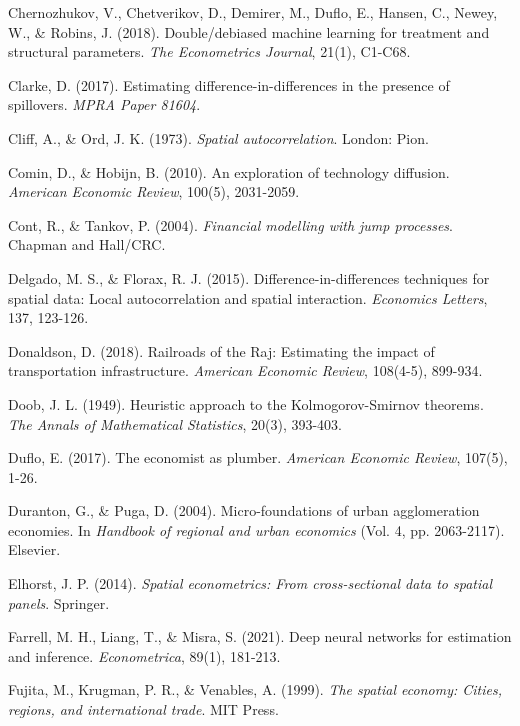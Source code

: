 \begin{thebibliography}{99}
Chernozhukov, V., Chetverikov, D., Demirer, M., Duflo, E., Hansen, C., Newey, W., \& Robins, J. (2018). Double/debiased machine learning for treatment and structural parameters. \textit{The Econometrics Journal}, 21(1), C1-C68.

Clarke, D. (2017). Estimating difference-in-differences in the presence of spillovers. \textit{MPRA Paper 81604}.

Cliff, A., \& Ord, J. K. (1973). \textit{Spatial autocorrelation}. London: Pion.

Comin, D., \& Hobijn, B. (2010). An exploration of technology diffusion. \textit{American Economic Review}, 100(5), 2031-2059.

Cont, R., \& Tankov, P. (2004). \textit{Financial modelling with jump processes}. Chapman and Hall/CRC.

Delgado, M. S., \& Florax, R. J. (2015). Difference-in-differences techniques for spatial data: Local autocorrelation and spatial interaction. \textit{Economics Letters}, 137, 123-126.

Donaldson, D. (2018). Railroads of the Raj: Estimating the impact of transportation infrastructure. \textit{American Economic Review}, 108(4-5), 899-934.

Doob, J. L. (1949). Heuristic approach to the Kolmogorov-Smirnov theorems. \textit{The Annals of Mathematical Statistics}, 20(3), 393-403.

Duflo, E. (2017). The economist as plumber. \textit{American Economic Review}, 107(5), 1-26.

Duranton, G., \& Puga, D. (2004). Micro-foundations of urban agglomeration economies. In \textit{Handbook of regional and urban economics} (Vol. 4, pp. 2063-2117). Elsevier.

Elhorst, J. P. (2014). \textit{Spatial econometrics: From cross-sectional data to spatial panels}. Springer.

Farrell, M. H., Liang, T., \& Misra, S. (2021). Deep neural networks for estimation and inference. \textit{Econometrica}, 89(1), 181-213.

Fujita, M., Krugman, P. R., \& Venables, A. (1999). \textit{The spatial economy: Cities, regions, and international trade}. MIT Press.


\end{thebibliography}
